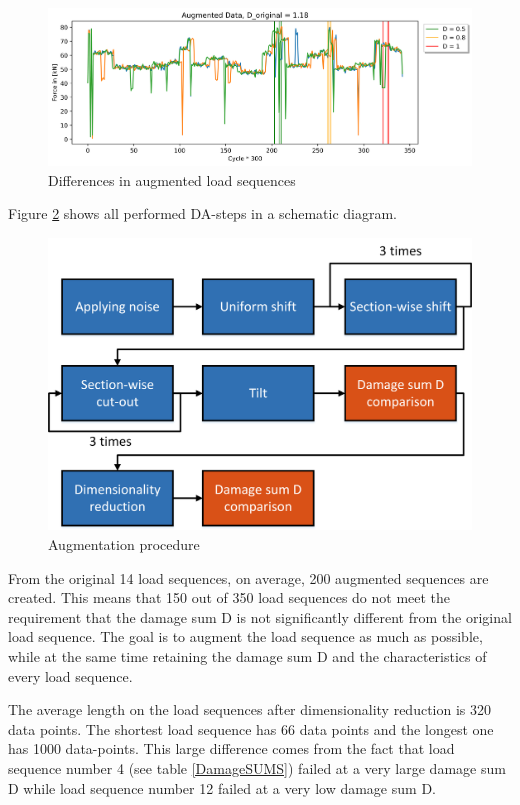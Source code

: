 \begin{figure}[H]
	\centering
	\includegraphics[width=1\linewidth]{IMGs/Augmented_5.png}
	\caption{Differences in augmented load sequences}
	\label{fig:3in1}
\end{figure}

Figure \ref{fig:allDA} shows all performed DA-steps in a schematic diagram.

\begin{figure}[H]
	\centering
	\includegraphics[width=0.7\linewidth]{IMGs/Augmentation.png}
	\caption{Augmentation procedure}
	\label{fig:allDA}
\end{figure}

From the original 14 load sequences, on average, 200 augmented sequences are created. This means that 150 out of 350 load sequences do not meet the requirement that the damage sum D is not significantly different from the original load sequence. 
The goal is to augment the load sequence as much as possible, while at the same time retaining the damage sum D and the characteristics of every load sequence. 


The average length on the load sequences after dimensionality reduction is 320 data points. The shortest load sequence has 66 data points and the longest one has 1000 data-points. This large difference comes from the fact that load sequence number 4 (see table \ref{DamageSUMS}) failed at a very large damage sum D while load sequence number 12 failed at a very low damage sum D.

